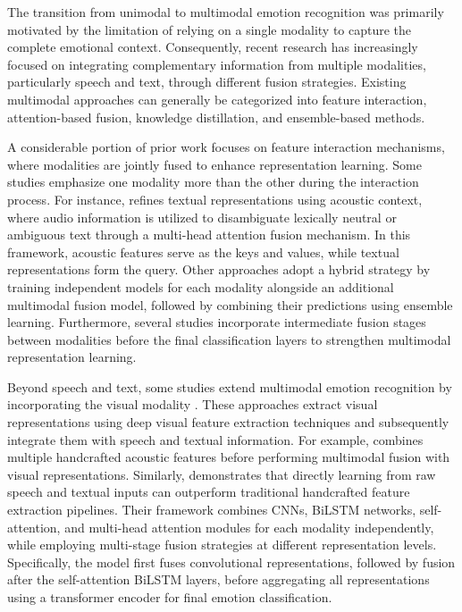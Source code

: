 The transition from unimodal to multimodal emotion recognition was primarily motivated by the limitation of relying on a single modality to capture the complete emotional context. Consequently, recent research has increasingly focused on integrating complementary information from multiple modalities, particularly speech and text, through different fusion strategies. Existing multimodal approaches can generally be categorized into feature interaction, attention-based fusion, knowledge distillation, and ensemble-based methods.

A considerable portion of prior work focuses on feature interaction mechanisms, where modalities are jointly fused to enhance representation learning. Some studies emphasize one modality more than the other during the interaction process. For instance,\cite{Koudounas2026} refines textual representations using acoustic context, where audio information is utilized to disambiguate lexically neutral or ambiguous text through a multi-head attention fusion mechanism. In this framework, acoustic features serve as the keys and values, while textual representations form the query. Other approaches adopt a hybrid strategy by training independent models for each modality alongside an additional multimodal fusion model, followed by combining their predictions using ensemble learning\cite{Chen2020}. Furthermore, several studies incorporate intermediate fusion stages between modalities before the final classification layers to strengthen multimodal representation learning\cite{Chudasama2022, Dikbiyik2025}.

Beyond speech and text, some studies extend multimodal emotion recognition by incorporating the visual modality \cite{Chudasama2022, ISLAM2026}. These approaches extract visual representations using deep visual feature extraction techniques and subsequently integrate them with speech and textual information. For example,\cite{ISLAM2026} combines multiple handcrafted acoustic features before performing multimodal fusion with visual representations. Similarly,\cite{Kakuba2023} demonstrates that directly learning from raw speech and textual inputs can outperform traditional handcrafted feature extraction pipelines. Their framework combines CNNs, BiLSTM networks, self-attention, and multi-head attention modules for each modality independently, while employing multi-stage fusion strategies at different representation levels. Specifically, the model first fuses convolutional representations, followed by fusion after the self-attention BiLSTM layers, before aggregating all representations using a transformer encoder for final emotion classification.

